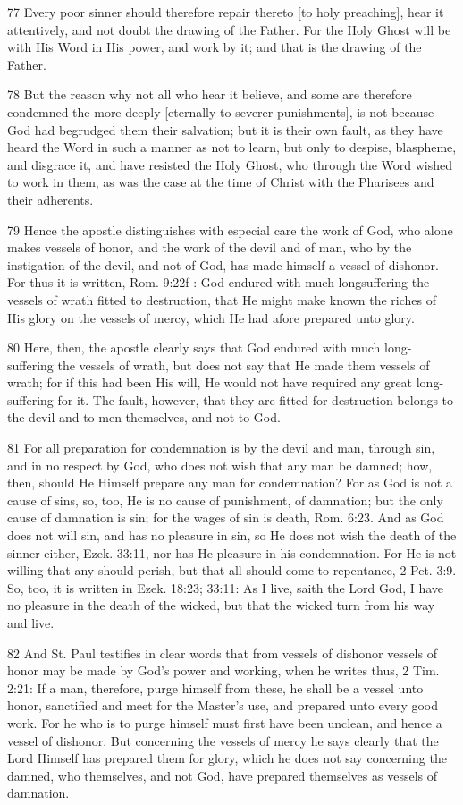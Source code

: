 {77 Every poor sinner should therefore repair thereto [to holy preaching], hear it attentively, and not doubt the drawing of the Father. For the Holy Ghost will be with His Word in His power, and work by it; and that is the drawing of the Father.

78 But the reason why not all who hear it believe, and some are therefore condemned the more deeply [eternally to severer punishments], is not because God had begrudged them their salvation; but it is their own fault, as they have heard the Word in such a manner as not to learn, but only to despise, blaspheme, and disgrace it, and have resisted the Holy Ghost, who through the Word wished to work in them, as was the case at the time of Christ with the Pharisees and their adherents.

79 Hence the apostle distinguishes with especial care the work of God, who alone makes vessels of honor, and the work of the devil and of man, who by the instigation of the devil, and not of God, has made himself a vessel of dishonor. For thus it is written, Rom. 9:22f : God endured with much longsuffering the vessels of wrath fitted to destruction, that He might make known the riches of His glory on the vessels of mercy, which He had afore prepared unto glory.

80 Here, then, the apostle clearly says that God endured with much long-suffering the vessels of wrath, but does not say that He made them vessels of wrath; for if this had been His will, He would not have required any great long-suffering for it. The fault, however, that they are fitted for destruction belongs to the devil and to men themselves, and not to God.

81 For all preparation for condemnation is by the devil and man, through sin, and in no respect by God, who does not wish that any man be damned; how, then, should He Himself prepare any man for condemnation? For as God is not a cause of sins, so, too, He is no cause of punishment, of damnation; but the only cause of damnation is sin; for the wages of sin is death, Rom. 6:23. And as God does not will sin, and has no pleasure in sin, so He does not wish the death of the sinner either, Ezek. 33:11, nor has He pleasure in his condemnation. For He is not willing that any should perish, but that all should come to repentance, 2 Pet. 3:9. So, too, it is written in Ezek. 18:23; 33:11: As I live, saith the Lord God, I have no pleasure in the death of the wicked, but that the wicked turn from his way and live.

82 And St. Paul testifies in clear words that from vessels of dishonor vessels of honor may be made by God’s power and working, when he writes thus, 2 Tim. 2:21: If a man, therefore, purge himself from these, he shall be a vessel unto honor, sanctified and meet for the Master’s use, and prepared unto every good work. For he who is to purge himself must first have been unclean, and hence a vessel of dishonor. But concerning the vessels of mercy he says clearly that the Lord Himself has prepared them for glory, which he does not say concerning the damned, who themselves, and not God, have prepared themselves as vessels of damnation.

}

